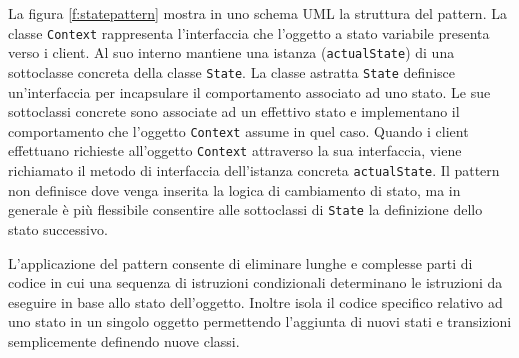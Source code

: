 La figura \ref{f:statepattern} mostra in uno schema \ac{UML} la struttura del pattern. La classe \texttt{Context} rappresenta l'interfaccia che l'oggetto a stato variabile presenta verso i client. Al suo interno mantiene una istanza (\texttt{actualState}) di una sottoclasse concreta della classe \texttt{State}.
La classe astratta \texttt{State} definisce un'interfaccia per incapsulare il comportamento associato ad uno stato.
Le sue sottoclassi concrete sono associate ad un effettivo stato e implementano il comportamento che l'oggetto \texttt{Context} assume in quel caso.
Quando i client effettuano richieste all'oggetto \texttt{Context} attraverso la sua interfaccia, viene richiamato il metodo di interfaccia dell'istanza concreta \texttt{actualState}.
Il pattern non definisce dove venga inserita la logica di cambiamento di stato, ma in generale \`e pi\`u flessibile consentire alle sottoclassi di \texttt{State} la definizione dello stato successivo.

L'applicazione del pattern consente di eliminare lunghe e complesse parti di codice in cui una sequenza di istruzioni condizionali determinano le istruzioni da eseguire in base allo stato dell'oggetto. Inoltre isola il codice specifico relativo ad uno stato in un singolo oggetto permettendo l'aggiunta di nuovi stati e transizioni semplicemente definendo nuove classi.